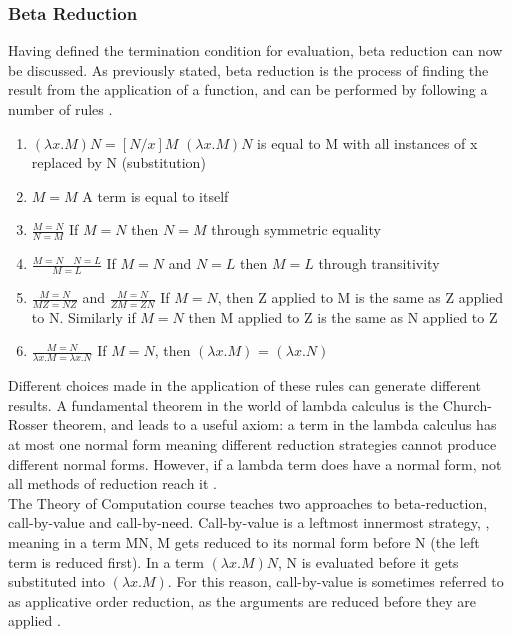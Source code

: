 \documentclass[a4paper,11pt]{report}
\begin{document}
\subsubsection{Beta Reduction}

Having defined the termination condition for evaluation, beta reduction can now be discussed. As previously stated, beta reduction is the process of finding the result from the application of a function, and can be performed by following a number of rules \cite{Gay2019}.

\begin{enumerate}
	\item $(\lambda x.M)N = [N / x]M$
	\subitem $(\lambda x.M)N$ is equal to M with all instances of x replaced by N (substitution)
	\item $M = M$
	\subitem A term is equal to itself
	\item $\frac{M=N}{N=M}$
	\subitem If $M=N$ then $N=M$ through symmetric equality
	\item $\frac{M=N \quad N=L}{M=L}$
	\subitem If $M=N$ and $N=L$ then $M=L$ through transitivity
	\item $\frac{M=N}{MZ=NZ}$ and $\frac{M=N}{ZM=ZN}$
	\subitem If $M=N$, then Z applied to M is the same as Z applied to N. Similarly if $M=N$ then M applied to Z is the same as N applied to Z
	\item $\frac{M=N}{\lambda x.M = \lambda x.N}$
	\subitem If $M=N$, then $(\lambda x.M)$ = $(\lambda x.N)$
\end{enumerate}

Different choices made in the application of these rules can generate different results. A fundamental theorem in the world of lambda calculus is the Church-Rosser theorem, and leads to a useful axiom: a term in the lambda calculus has at most one normal form \cite{Alonzo1936} meaning different reduction strategies cannot produce different normal forms. However, if a lambda term does have a normal form, not all methods of reduction reach it \cite{Horowitz2013}.\\

The Theory of Computation course teaches two approaches to beta-reduction, call-by-value and call-by-need. Call-by-value is a leftmost innermost strategy, \cite{Gay2019}, meaning in a term MN, M gets reduced to its normal form before N (the left term is reduced first). In a term $(\lambda x.M)N$, N is evaluated before it gets substituted into $(\lambda x.M)$. For this reason, call-by-value is sometimes referred to as applicative order reduction, as the arguments are reduced before they are applied \cite{Sookocheff2018Evaluation}.\\
\end{document}

